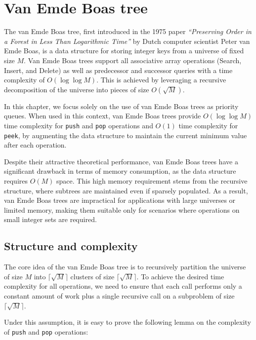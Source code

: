 \section{Van Emde Boas tree}

The van Emde Boas tree, first introduced in the 1975 paper \emph{``Preserving Order in a Forest in Less Than Logarithmic Time''} \cite{vanEmdeBoas1975} by Dutch computer scientist Peter van Emde Boas, is a data structure for storing integer keys from a universe of fixed size \( M \). Van Emde Boas trees support all associative array operations (Search, Insert, and Delete) as well as predecessor and successor queries with a time complexity of \( O(\log \log M) \). This is achieved by leveraging a recursive decomposition of the universe into pieces of size \( O(\sqrt{M}) \). 

In this chapter, we focus solely on the use of van Emde Boas trees as priority queues. When used in this context, van Emde Boas trees provide \( O(\log \log M) \) time complexity for \texttt{push} and \texttt{pop} operations and \( O(1) \) time complexity for \texttt{peek}, by augmenting the data structure to maintain the current minimum value after each operation.

Despite their attractive theoretical performance, van Emde Boas trees have a significant drawback in terms of memory consumption, as the data structure requires \( O(M) \) space. This high memory requirement stems from the recursive structure, where subtrees are maintained even if sparsely populated. As a result, van Emde Boas trees are impractical for applications with large universes or limited memory, making them suitable only for scenarios where operations on small integer sets are required.

\subsection{Structure and complexity}

The core idea of the van Emde Boas tree is to recursively partition the universe of size \( M \) into \( \lceil \sqrt{M} \rceil \) clusters of size \( \lceil \sqrt{M} \rceil \). To achieve the desired time complexity for all operations, we need to ensure that each call performs only a constant amount of work plus a single recursive call on a subproblem of size \( \lceil \sqrt{M} \rceil \). 

Under this assumption, it is easy to prove the following lemma on the complexity of \texttt{push} and \texttt{pop} operations:

